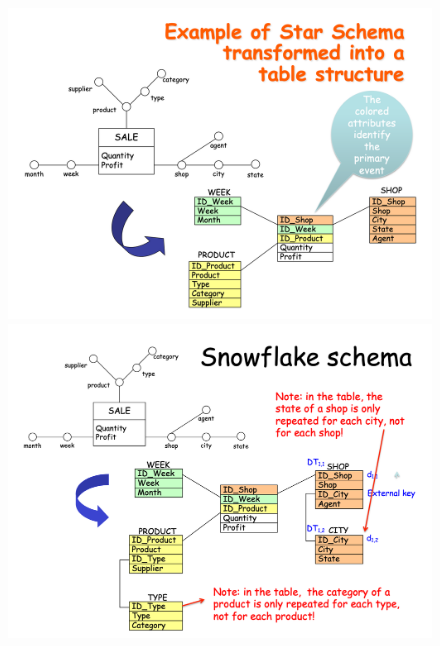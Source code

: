 \documentclass[10pt,a4paper]{article}
\begin{document}
\begin{justify}
\begin{itemize}
\end{itemize}
\begin{figure}[htp]
\centering
\includegraphics[width=.4\textwidth]{images/star}\hfill
\includegraphics[width=.4\textwidth]{images/snowflake}\hfill
\end{figure}

\end{justify}
\end{document}
